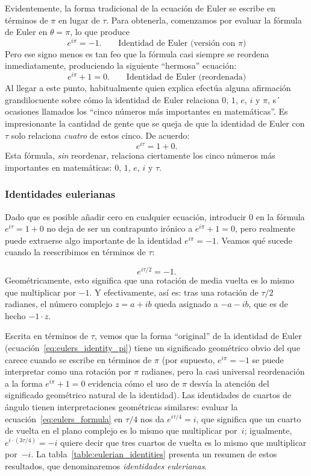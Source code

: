 Evidentemente, la forma tradicional de la ecuación de Euler se escribe en términos de $\pi$ en lugar de $\tau$. Para obtenerla, comenzamos por evaluar la fórmula de Euler en $\theta = \pi$, lo que produce
\begin{equation}
\label{eq:eulers_identity_pi}
e^{i\pi} = -1. \qquad\mbox{Identidad de Euler (versión con $\pi$)}
\end{equation}
Pero ese signo menos es tan feo que la fórmula casi siempre se reordena inmediatamente, produciendo la siguiente ``hermosa'' ecuación:
\[ e^{i\pi} + 1 = 0. \qquad\mbox{Identidad de Euler (reordenada)} \]
Al llegar a este punto, habitualmente quien explica efectúa alguna afirmación grandilocuente sobre cómo la identidad de Euler relaciona $0$, $1$, $e$, $i$ y $\pi$, s´ ocasiones llamados los ``cinco números más importantes en matemáticas''. Es impresionante la cantidad de gente que se queja de que la identidad de Euler con $\tau$ solo relaciona \emph{cuatro} de estos cinco. De acuerdo:
\[ e^{i\tau} = 1 + 0. \]
Esta fórmula, \emph{sin} reordenar, relaciona ciertamente los cinco números más importantes en matemáticas: $0$, $1$, $e$, $i$ y $\tau$.

      \subsubsection{Identidades eulerianas} %
      \label{sec:eulerian_identities}

Dado que es posible añadir cero en cualquier ecuación, introducir $0$ en la fórmula $e^{i\tau} = 1 + 0$ no deja de ser un contrapunto irónico a $e^{i\pi} + 1 = 0$, pero realmente puede extraerse algo importante de la identidad $e^{i\pi} = -1$. Veamos qué sucede cuando la reescribimos en términos de $\tau$:

\[
e^{i\tau/2} = -1.
\]
Geométricamente, esto significa que una rotación de media vuelta es lo mismo que multiplicar por $-1$. Y efectivamente, así es: tras una rotación de $\tau/2$ radianes, el número complejo $z = a + ib$ queda asignado a $-a - ib$, que es de hecho $-1\cdot z$.

Escrita en términos de $\tau$, vemos que la forma ``original'' de la identidad de Euler (ecuación~\eqref{eq:eulers_identity_pi}) tiene un significado geométrico obvio del que carece cuando se escribe en términos de $\pi$ (por supuesto, $e^{i\pi} = -1$ se puede interpretar como una rotación por $\pi$ radianes, pero la casi universal reordenación a la forma $e^{i\pi} + 1 = 0$ evidencia cómo el uso de $\pi$ desvía la atención del significado geométrico natural de la identidad). Las identidades de cuartos de ángulo tienen interpretaciones geométricas similares: evaluar la ecuación~\eqref{eq:eulers_formula} en $\tau/4$ nos da $e^{i\tau/4} = i$, que significa que un cuarto de vuelta en el plano complejo es lo mismo que multiplicar por~$i$; igualmente, $e^{i\cdot(3\tau/4)} = -i$ quiere decir que tres cuartos de vuelta es lo mismo que multiplicar por~$-i$. La tabla~\ref{table:eulerian_identities} presenta un resumen de estos resultados, que denominaremos \emph{identidades eulerianas}.


